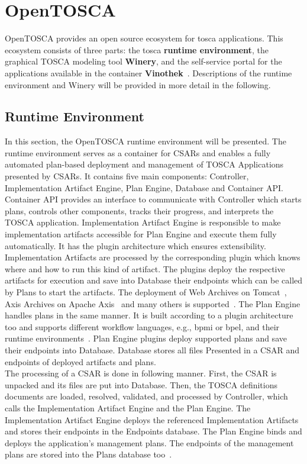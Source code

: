 \section{OpenTOSCA} \label{sec:opentosca}
OpenTOSCA provides an open source ecosystem for \gls{tosca} applications. 
This ecosystem consists of three parts: the \gls{tosca} \textbf{runtime environment}, the graphical TOSCA modeling tool \textbf{Winery}, and the self-service portal for the applications available in the container \textbf{Vinothek}~\cite*{OpenTOSCA}.
Descriptions of the runtime environment and Winery will be provided in more detail in the following. 
\subsection*{Runtime Environment}
In this section, the OpenTOSCA runtime environment will be presented.
The runtime environment serves as a container for CSARs and enables a fully automated plan-based deployment and management of TOSCA Applications presented by CSARs. 
It contains five main components: Controller, Implementation Artifact Engine, Plan Engine, Database and Container API.
Container API provides an interface to communicate with Controller which starts plans, controls other components, tracks their progress, and interprets the TOSCA application.
Implementation Artifact Engine is responsible to make implementation artifacts accessible for Plan Engine and execute them fully automatically.
It has the plugin architecture which ensures extensibility.
Implementation Artifacts are processed by the corresponding plugin which knows where and how to run this kind of artifact. 
The plugins deploy the respective artifacts for execution and save into Database their endpoints which can be called by Plans to start the artifacts.
The deployment of Web Archives on Tomcat~\cite*{tomcat}, Axis Archives on Apache Axis~\cite*{axis} and many others is supported~\cite*{macharb}.
The Plan Engine handles plans in the same manner.
It is built according to a plugin architecture too and supports different workflow languages, e.g., \gls{bpmi} or \gls{bpel}, and their runtime environments~\cite{INPROC-2013-45}.
Plan Engine plugins deploy supported plans and save their endpoints into Database.
Database stores all files Presented in a CSAR and endpoints of deployed artifacts and plans.
\\
The processing of a CSAR is done in following manner.  
First, the CSAR is unpacked and its files are put into Database.
Then, the TOSCA definitions documents are loaded, resolved, validated, and processed by Controller, which calls the Implementation Artifact Engine and the Plan Engine.
The Implementation Artifact Engine deploys the referenced Implementation Artifacts and stores their endpoints in the Endpoints database. 
The Plan Engine binds and deploys the application’s management plans.
The endpoints of the management plans are stored into the Plans database too~\cite{INPROC-2013-45}.
%
%
